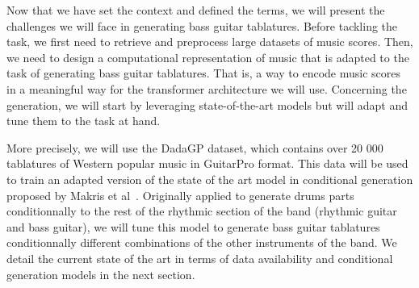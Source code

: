 Now that we have set the context and defined the terms, we will present the challenges we will face in generating bass guitar tablatures.
Before tackling the task, we first need to retrieve and preprocess large datasets of music scores.
Then, we need to design a computational representation of music that is adapted to the task of generating bass guitar tablatures.
That is, a way to encode music scores in a meaningful way for the transformer architecture we will use.
Concerning the generation, we will start by leveraging state-of-the-art models but will adapt and tune them to the task at hand.

More precisely, we will use the DadaGP dataset, which contains over 20 000 tablatures of Western popular music in GuitarPro format.
This data will be used to train an adapted version of the state of the art model in conditional generation proposed by Makris et al~\cite{makris_conditional_2022}.
Originally applied to generate drums parts conditionnally to the rest of the rhythmic section of the band (rhythmic guitar and bass guitar),
we will tune this model to generate bass guitar tablatures conditionnally different combinations of the other instruments of the band.
We detail the current state of the art in terms of data availability and conditional generation models in the next section.